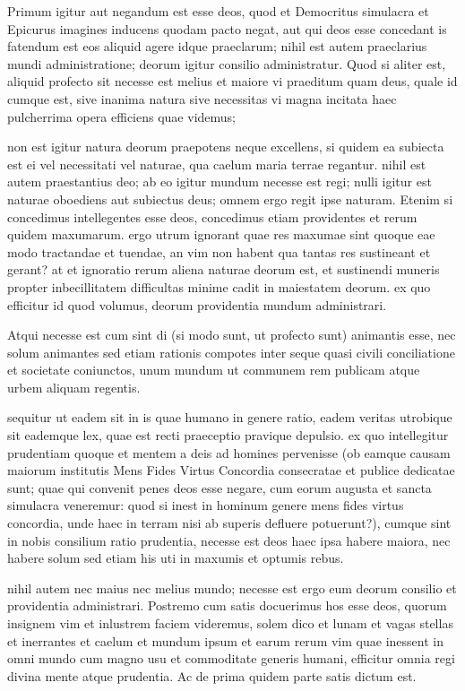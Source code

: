  Primum igitur aut negandum est esse deos, quod et Democritus simulacra et Epicurus imagines inducens quodam pacto negat, aut qui deos esse concedant is fatendum est eos aliquid agere idque praeclarum; nihil est autem praeclarius mundi administratione; deorum igitur consilio administratur. Quod si aliter est, aliquid profecto sit necesse est melius et maiore vi praeditum quam deus, quale id cumque est, sive inanima natura sive necessitas vi magna incitata haec pulcherrima opera efficiens quae videmus;

 non est igitur natura deorum praepotens neque excellens, si quidem ea subiecta est ei vel necessitati vel naturae, qua caelum maria terrae regantur. nihil est autem praestantius deo; ab eo igitur mundum necesse est regi; nulli igitur est naturae oboediens aut subiectus deus; omnem ergo regit ipse naturam. Etenim si concedimus intellegentes esse deos, concedimus etiam providentes et rerum quidem maxumarum. ergo utrum ignorant quae res maxumae sint quoque eae modo tractandae et tuendae, an vim non habent qua tantas res sustineant et gerant? at et ignoratio rerum aliena naturae deorum est, et sustinendi muneris propter inbecillitatem difficultas minime cadit in maiestatem deorum. ex quo efficitur id quod volumus, deorum providentia mundum administrari.

 Atqui necesse est cum sint di (si modo sunt, ut profecto sunt) animantis esse, nec solum animantes sed etiam rationis compotes inter seque quasi civili conciliatione et societate coniunctos, unum mundum ut communem rem publicam atque urbem aliquam regentis.

 sequitur ut eadem sit in is quae humano in genere ratio, eadem veritas utrobique sit eademque lex, quae est recti praeceptio pravique depulsio. ex quo intellegitur prudentiam quoque et mentem a deis ad homines pervenisse (ob eamque causam maiorum institutis Mens Fides Virtus Concordia consecratae et publice dedicatae sunt; quae qui convenit penes deos esse negare, cum eorum augusta et sancta simulacra veneremur: quod si inest in hominum genere mens fides virtus concordia, unde haec in terram nisi ab superis defluere potuerunt?), cumque sint in nobis consilium ratio prudentia, necesse est deos haec ipsa habere maiora, nec habere solum sed etiam his uti in maxumis et optumis rebus.

 nihil autem nec maius nec melius mundo; necesse est ergo eum deorum consilio et providentia administrari. Postremo cum satis docuerimus hos esse deos, quorum insignem vim et inlustrem faciem videremus, solem dico et lunam et vagas stellas et inerrantes et caelum et mundum ipsum et earum rerum vim quae inessent in omni mundo cum magno usu et commoditate generis humani, efficitur omnia regi divina mente atque prudentia. Ac de prima quidem parte satis dictum est.

